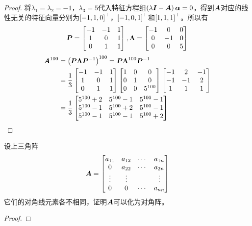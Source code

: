 \begin{proof}
    将\(\lambda_1=\lambda_2=-1\)，\(\lambda_3=5\)代入特征方程组\(\left( \lambda\boldsymbol{I}-\boldsymbol{A} \right)\boldsymbol{\alpha}=0\)，得到\(\boldsymbol{A}\)对应的线性无关的特征向量分别为\(\left[ -1,1,0 \right]^\top\)，\(\left[ -1,0,1 \right]^\top\)和\(\left[ 1,1,1 \right]^\top\)。所以有
    \begin{equation*}
        \boldsymbol{P}=\begin{bmatrix}-1&-1&1\\1&0&1\\0&1&1\end{bmatrix},\boldsymbol{\Lambda}=\begin{bmatrix}-1&0&0\\0&-1&0\\0&0&5\end{bmatrix}
    \end{equation*}
    \begin{align*}
        \boldsymbol{A}^{100} & =\left( \boldsymbol{P}\boldsymbol{\Lambda}{\boldsymbol{P}}^{-1} \right)^{100}=\boldsymbol{P}\boldsymbol{\Lambda}^{100}{\boldsymbol{P}}^{-1}                                                                                                  \\
                    & =\frac{1}{3}\begin{bmatrix}-1&-1&1\\1&0&1\\0&1&1\end{bmatrix}\begin{bmatrix}1&0&0\\0&1&0\\0&0&5^{100}\end{bmatrix}\begin{bmatrix}-1&2&-1\\-1&-1&2\\1&1&1\end{bmatrix} \\
                    & =\frac{1}{3}\begin{bmatrix}5^{100}+2&5^{100}-1&5^{100}-1\\5^{100}-1&5^{100}+2&5^{100}-1\\5^{100}-1&5^{100}-1&5^{100}+2\end{bmatrix}
    \end{align*}
\end{proof}

\begin{problem}
设上三角阵
\begin{equation*}
    \boldsymbol{A}=
    \begin{bmatrix}
        a_{11} & a_{12} & \cdots & a_{1n} \\
        0      & a_{22} & \cdots & a_{2n} \\
        \vdots & \vdots &        & \vdots \\
        0      & 0      & \cdots & a_{nn}
    \end{bmatrix}
\end{equation*}
它们的对角线元素各不相同，证明\(\boldsymbol{A}\)可以化为对角阵。
\end{problem}
\begin{proof}
\end{proof}


